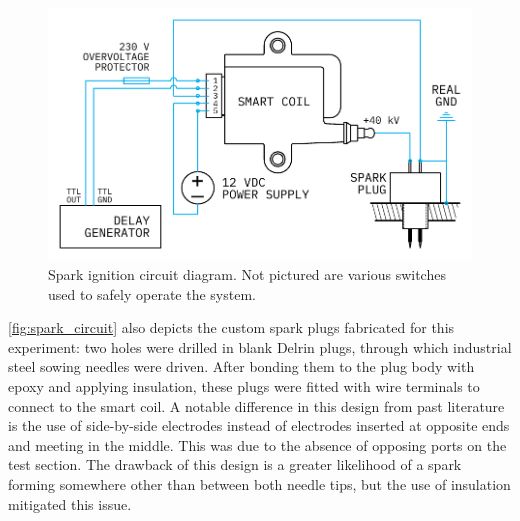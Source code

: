             \begin{figure}[h]
                \centering
                \includegraphics[]{assets/3 design/sparkIgniter}
                \caption[Spark ignition circuit diagram]{Spark ignition circuit diagram. Not pictured are various switches used to safely operate the system.}
                \label{fig:spark_circuit}
            \end{figure}

            \autoref{fig:spark_circuit} also depicts the custom spark plugs fabricated for this experiment: two holes were drilled in blank Delrin plugs, through which industrial steel sowing needles were driven. After bonding them to the plug body with epoxy and applying insulation, these plugs were fitted with wire terminals to connect to the smart coil. A notable difference in this design from past literature is the use of side-by-side electrodes instead of electrodes inserted at opposite ends and meeting in the middle. This was due to the absence of opposing ports on the test section. The drawback of this design is a greater likelihood of a spark forming somewhere other than between both needle tips, but the use of insulation mitigated this issue.

